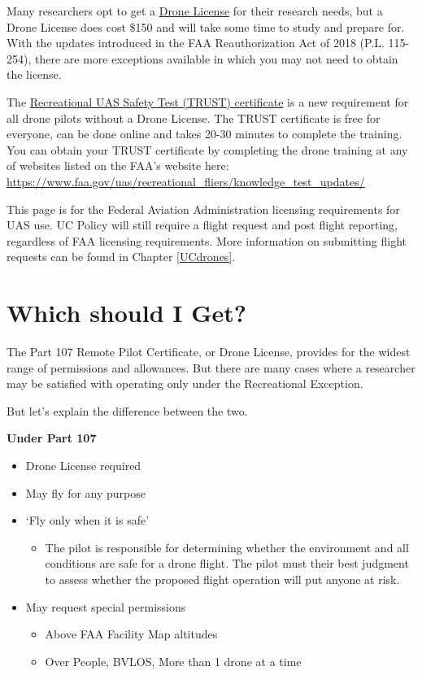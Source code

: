\documentclass[
  12pt,
]{book}
\providecommand{\tightlist}{%
  \setlength{\itemsep}{0pt}\setlength{\parskip}{0pt}}
\newenvironment{notebox}{
  \definecolor{shadecolor}{gray}{.8}  %
  \color{black}
  \begin{shaded}}
 {\end{shaded}}
\begin{document}
Many researchers opt to get a \hyperref[get-license]{Drone License} for their research needs, but a Drone License does cost \$150 and will take some time to study and prepare for. With the updates introduced in the FAA Reauthorization Act of 2018 (P.L. 115-254), there are more exceptions available in which you may not need to obtain the license.

The \hyperref[TRUST]{Recreational UAS Safety Test (TRUST) certificate} is a new requirement for all drone pilots without a Drone License. The TRUST certificate is free for everyone, can be done online and takes 20-30 minutes to complete the training. You can obtain your TRUST certificate by completing the drone training at any of websites listed on the FAA's website here: \url{https://www.faa.gov/uas/recreational_fliers/knowledge_test_updates/}

\begin{notebox}
This page is for the Federal Aviation Administration licensing requirements for UAS use. UC Policy will still require a flight request and post flight reporting, regardless of FAA licensing requirements. More information on submitting flight requests can be found in Chapter \ref{UCdrones}.

\end{notebox}

\section{Which should I Get?}\label{difference}

The Part 107 Remote Pilot Certificate, or Drone License, provides for the widest range of permissions and allowances. But there are many cases where a researcher may be satisfied with operating only under the Recreational Exception.

But let's explain the difference between the two.

\textbf{Under Part 107}

\begin{itemize}
\tightlist
\item
  Drone License required
\item
  May fly for any purpose
\item
  `Fly only when it is safe'

  \begin{itemize}
  \tightlist
  \item
    The pilot is responsible for determining whether the environment and all conditions are safe for a drone flight. The pilot must their best judgment to assess whether the proposed flight operation will put anyone at risk.
  \end{itemize}
\item
  May request special permissions

  \begin{itemize}
  \tightlist
  \item
    Above FAA Facility Map altitudes
  \item
    Over People, BVLOS, More than 1 drone at a time
  \end{itemize}
\end{itemize}
\end{document}
